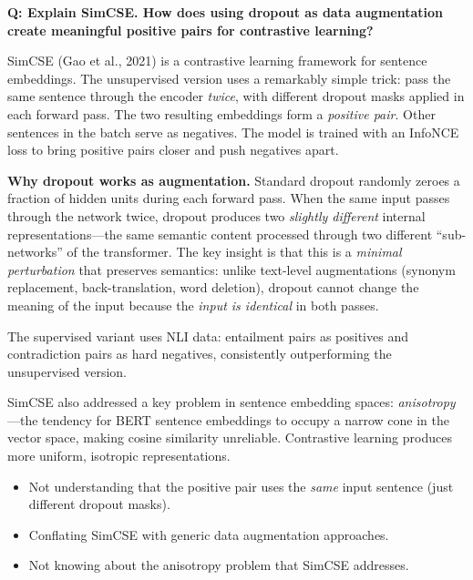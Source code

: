 \begin{interviewq}
\textbf{Q: Explain SimCSE. How does using dropout as data augmentation
create meaningful positive pairs for contrastive learning?}

 \quad {} \quad \badgefreq{\freqmed}

\stronganswer
SimCSE (Gao et al., 2021) is a contrastive learning framework for sentence
embeddings.  The unsupervised version uses a remarkably simple trick: pass the
same sentence through the encoder \emph{twice}, with different dropout masks
applied in each forward pass.  The two resulting embeddings form a
\emph{positive pair}.  Other sentences in the batch serve as negatives.  The
model is trained with an InfoNCE loss to bring positive pairs closer and push
negatives apart.

\textbf{Why dropout works as augmentation.}  Standard dropout randomly zeroes
a fraction of hidden units during each forward pass.  When the same input
passes through the network twice, dropout produces two \emph{slightly
different} internal representations---the same semantic content processed
through two different ``sub-networks'' of the transformer.  The key insight is
that this is a \emph{minimal perturbation} that preserves semantics: unlike
text-level augmentations (synonym replacement, back-translation, word
deletion), dropout cannot change the meaning of the input because the
\emph{input is identical} in both passes.

The supervised variant uses NLI data: entailment pairs as positives and
contradiction pairs as hard negatives, consistently outperforming the
unsupervised version.

SimCSE also addressed a key problem in sentence embedding spaces:
\emph{anisotropy}---the tendency for BERT sentence embeddings to occupy a
narrow cone in the vector space, making cosine similarity unreliable.
Contrastive learning produces more uniform, isotropic representations.

\redflags
\begin{itemize}
    \item Not understanding that the positive pair uses the \emph{same}
    input sentence (just different dropout masks).
    \item Conflating SimCSE with generic data augmentation approaches.
    \item Not knowing about the anisotropy problem that SimCSE addresses.
\end{itemize}


\end{interviewq}
